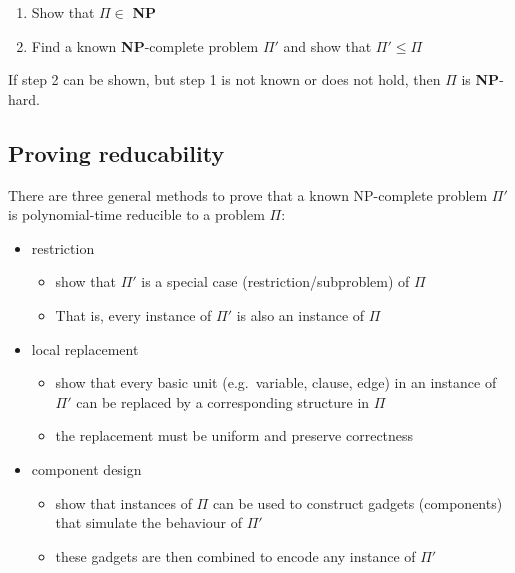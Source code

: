 \documentclass[11pt]{article}
\providecommand{\tightlist}{%
      \setlength{\itemsep}{0pt}\setlength{\parskip}{0pt}}
\begin{document}
\begin{enumerate}
\def\labelenumi{\arabic{enumi}.}
\tightlist
\item
  Show that \(\Pi \in\) \textbf{NP}
\item
  Find a known \textbf{NP}-complete problem \(\Pi'\) and show that
  \(\Pi' \leq \Pi\)
\end{enumerate}

If step 2 can be shown, but step 1 is not known or does not hold, then
\(\Pi\) is \textbf{NP}-hard.

    \subsection{Proving reducability}\label{proving-reducability}

There are three general methods to prove that a known NP-complete
problem \(\Pi'\) is polynomial-time reducible to a problem \(\Pi\):

\begin{itemize}
\tightlist
\item
  restriction

  \begin{itemize}
  \tightlist
  \item
    show that \(\Pi'\) is a special case (restriction/subproblem) of
    \(\Pi\)
  \item
    That is, every instance of \(\Pi'\) is also an instance of \(\Pi\)
  \end{itemize}
\item
  local replacement

  \begin{itemize}
  \tightlist
  \item
    show that every basic unit (e.g.~variable, clause, edge) in an
    instance of \(\Pi'\) can be replaced by a corresponding structure in
    \(\Pi\)
  \item
    the replacement must be uniform and preserve correctness
  \end{itemize}
\item
  component design

  \begin{itemize}
  \tightlist
  \item
    show that instances of \(\Pi\) can be used to construct gadgets
    (components) that simulate the behaviour of \(\Pi'\)
  \item
    these gadgets are then combined to encode any instance of \(\Pi'\)
  \end{itemize}
\end{itemize}
\end{document}
